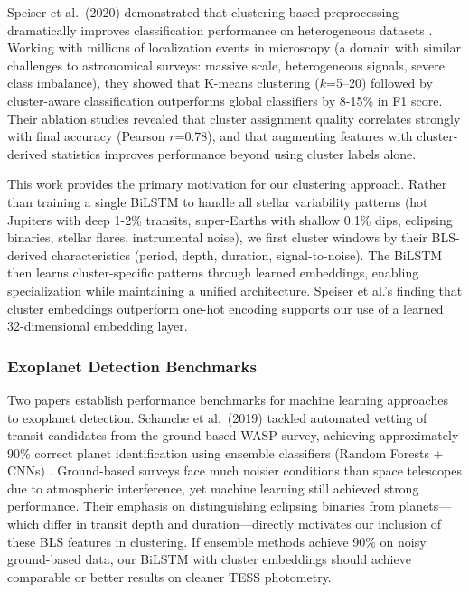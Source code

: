 Speiser et al.\ (2020) demonstrated that clustering-based preprocessing dramatically improves classification performance on heterogeneous datasets \cite{Speiser2020clustering}. Working with millions of localization events in microscopy (a domain with similar challenges to astronomical surveys: massive scale, heterogeneous signals, severe class imbalance), they showed that K-means clustering ($k$=5--20) followed by cluster-aware classification outperforms global classifiers by 8-15\% in F1 score. Their ablation studies revealed that cluster assignment quality correlates strongly with final accuracy (Pearson $r$=0.78), and that augmenting features with cluster-derived statistics improves performance beyond using cluster labels alone.

This work provides the primary motivation for our clustering approach. Rather than training a single BiLSTM to handle all stellar variability patterns (hot Jupiters with deep 1-2\% transits, super-Earths with shallow 0.1\% dips, eclipsing binaries, stellar flares, instrumental noise), we first cluster windows by their BLS-derived characteristics (period, depth, duration, signal-to-noise). The BiLSTM then learns cluster-specific patterns through learned embeddings, enabling specialization while maintaining a unified architecture. Speiser et al.'s finding that cluster embeddings outperform one-hot encoding supports our use of a learned 32-dimensional embedding layer.

\subsubsection{Exoplanet Detection Benchmarks}

Two papers establish performance benchmarks for machine learning approaches to exoplanet detection. Schanche et al.\ (2019) tackled automated vetting of transit candidates from the ground-based WASP survey, achieving approximately 90\% correct planet identification using ensemble classifiers (Random Forests + CNNs) \cite{Schanche2019mlexoplanet}. Ground-based surveys face much noisier conditions than space telescopes due to atmospheric interference, yet machine learning still achieved strong performance. Their emphasis on distinguishing eclipsing binaries from planets---which differ in transit depth and duration---directly motivates our inclusion of these BLS features in clustering. If ensemble methods achieve 90\% on noisy ground-based data, our BiLSTM with cluster embeddings should achieve comparable or better results on cleaner TESS photometry.

